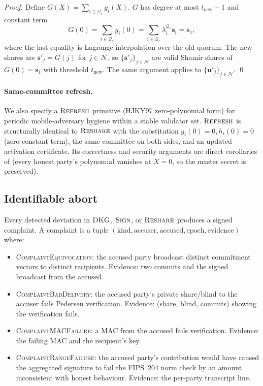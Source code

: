 \documentclass[11pt,a4paper]{article}
\theoremstyle{definition}
\theoremstyle{remark}
\newcommand{\Sign}{\textsc{Sign}}
\newcommand{\DKG}{\textsc{DKG}}
\newcommand{\Reshare}{\textsc{Reshare}}
\newcommand{\Refresh}{\textsc{Refresh}}
\begin{document}
\begin{proof}
Define $G(X) = \sum_{i \in \mathcal{Q}_e} g_i(X)$. $G$ has degree at
most $t_{\mathrm{new}} - 1$ and constant term
\[
G(0) = \sum_{i \in \mathcal{Q}_e} g_i(0)
= \sum_{i \in \mathcal{Q}_e} \lambda_i^{\mathcal{Q}_e} \mathbf{s}_i
= \mathbf{s}_1,
\]
where the last equality is Lagrange interpolation over the old
quorum. The new shares are $\mathbf{s}'_j = G(j)$ for $j \in \mathcal{N}$,
so $\{\mathbf{s}'_j\}_{j \in \mathcal{N}}$ are valid Shamir shares of
$G(0) = \mathbf{s}_1$ with threshold $t_{\mathrm{new}}$. The same argument
applies to $\{\mathbf{u}'_j\}_{j \in \mathcal{N}}$. \qed
\end{proof}

\paragraph{Same-committee refresh.}
We also specify a $\Refresh$ primitive (HJKY97 zero-polynomial form)
for periodic mobile-adversary hygiene within a stable validator set.
$\Refresh$ is structurally identical to $\Reshare$ with the
substitution $g_i(0) = 0, h_i(0) = 0$ (zero constant term), the same
committee on both sides, and an updated activation certificate. Its
correctness and security arguments are direct corollaries of
 (every honest party's polynomial vanishes at
$X = 0$, so the master secret is preserved).

\subsection{Identifiable abort}
\label{sec:abort}

Every detected deviation in $\DKG$, $\Sign$, or $\Reshare$ produces
a signed complaint. A complaint is a tuple
$(\text{kind}, \text{accuser}, \text{accused}, \text{epoch}, \text{evidence})$
where:

\begin{itemize}[leftmargin=*, itemsep=0pt]
\item \textsc{ComplaintEquivocation}: the accused party broadcast distinct commitment vectors to distinct recipients. Evidence: two commits and the signed broadcast from the accused.
\item \textsc{ComplaintBadDelivery}: the accused party's private share/blind to the accuser fails Pedersen verification. Evidence: (share, blind, commits) showing the verification fails.
\item \textsc{ComplaintMACFailure}: a MAC from the accused fails verification. Evidence: the failing MAC and the recipient's key.
\item \textsc{ComplaintRangeFailure}: the accused party's contribution would have caused the aggregated signature to fail the FIPS~204 norm check by an amount inconsistent with honest behaviour. Evidence: the per-party transcript line.
\end{itemize}
\end{document}
